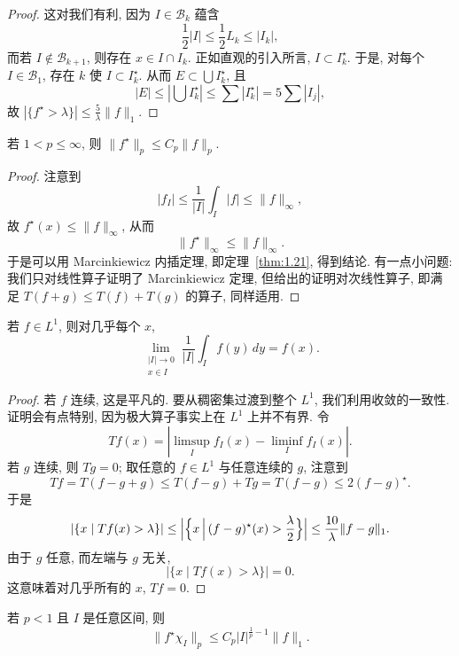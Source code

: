 \begin{proof}
这对我们有利, 因为 $I\in\mathcal{B}_k$ 蕴含
\[
\frac{1}{2}|I|\leq\frac{1}{2}L_{k}\leq|I_{k}|,
\]
而若 $I\notin\mathcal{B}_{k+1}$, 则存在 $x\in I\cap I_k$. 正如直观的引入所言, $I\subset I_k^{\star}$. 于是, 对每个 $I\in\mathcal{B}_1$, 存在 $k$ 使 $I\subset I_k^{\star}$. 从而 $E\subset\bigcup I_k^{\star}$, 且
\[
\left|E\right|\leq\left|\bigcup I_{k}^{\star}\right|\leq\sum\left|I_{k}^{\star}\right|=5\sum\left|I_{j}\right|,
\]
故 $|\{f^{\star}>\lambda\}|\leq\frac{5}{\lambda}\|f\|_{1}$.
\end{proof}

\begin{corollary}\label{cor:2.25}
若 $1<p\leq\infty$, 则 $\|f^{\star}\|_p\leq C_p\|f\|_p$.
\end{corollary}

\begin{proof}
注意到
\[
|f_{I}|\leq\frac{1}{|I|}\int_{I}|f|\leq\|f\|_{\infty},
\]
故 $f^{\star}(x)\leq\|f\|_{\infty}$, 从而
\[
\|f^{\star}\|_{\infty}\leq\|f\|_{\infty}.
\]
于是可以用 Marcinkiewicz 内插定理, 即定理~\ref{thm:1.21}, 得到结论. 有一点小问题: 我们只对线性算子证明了 Marcinkiewicz 定理, 但给出的证明对次线性算子, 即满足 $T(f+g)\leq T(f)+T(g)$ 的算子, 同样适用.
\end{proof}

\begin{corollary}\label{cor:2.26}
若 $f\in L^{1}$, 则对几乎每个 $x$,
\[
\lim_{\substack{|I|\to0\\ x\in I}}\frac{1}{|I|}\int_{I}f(y)\,dy=f(x).
\]
\end{corollary}

\begin{proof}
若 $f$ 连续, 这是平凡的. 要从稠密集过渡到整个 $L^{1}$, 我们利用收敛的一致性. 证明会有点特别, 因为极大算子事实上在 $L^{1}$ 上并不有界. 令
\[
T f(x)=\left|\limsup_{I}f_{I}(x)-\liminf_{I}f_{I}(x)\right|.
\]
若 $g$ 连续, 则 $Tg=0$; 取任意的 $f\in L^1$ 与任意连续的 $g$, 注意到
\[
T f=T(f-g+g)\leq T(f-g)+Tg=T(f-g)\leq 2(f-g)^{\star}.
\]
于是
\[
|\{x \mid T f(x)>\lambda\}|\leq\Bigl|\Bigl\{x \,\Big|\, (f-g)^{\star}(x)>\frac{\lambda}{2}\Bigr\}\Bigr|\leq\frac{10}{\lambda}\|f-g\|_{1}.
\]
由于 $g$ 任意, 而左端与 $g$ 无关,
\[
|\{x \mid T f(x)>\lambda\}|=0.
\]
这意味着对几乎所有的 $x$, $Tf=0$.
\end{proof}

\begin{corollary}\label{cor:2.27}
若 $p<1$ 且 $I$ 是任意区间, 则
\[
\|f^{\star}\chi_{I}\|_{p}\leq C_{p}|I|^{\frac{1}{p}-1}\|f\|_{1}.
\]
\end{corollary}

